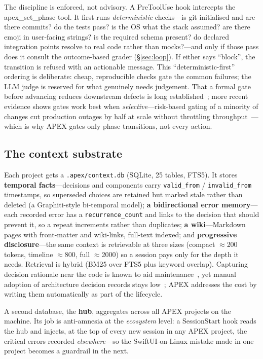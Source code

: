 \documentclass[sigconf,review,anonymous=false]{acmart}
\begin{document}
The discipline is enforced, not advisory. A \textsf{PreToolUse} hook intercepts the
\textsf{apex\_set\_phase} tool. It first runs \emph{deterministic} checks---is git
initialised and are there commits? do the tests pass? is the OS what the stack
assumed? are there emoji in user-facing strings? is the required schema present?
do declared integration points resolve to real code rather than mocks?---and only
if those pass does it consult the outcome-based grader (\S\ref{sec:loop}). If
either says ``block'', the transition is refused with an actionable message. This
``deterministic-first'' ordering is deliberate: cheap, reproducible checks gate the
common failures; the LLM judge is reserved for what genuinely needs judgement. That a
formal gate before advancing reduces downstream defects is long
established~\cite{fagan1986inspections,harter2000process}; more recent evidence shows
gates work best when \emph{selective}---risk-based gating of a minority of changes cut
production outages by half at scale without throttling
throughput~\cite{mockus2025riskgating}---which is why APEX gates only phase
transitions, not every action.

\subsection{The context substrate}
Each project gets a \texttt{.apex/context.db} (SQLite, 25 tables, FTS5). It stores
\textbf{temporal facts}---decisions and components carry \texttt{valid\_from} /
\texttt{invalid\_from} timestamps, so superseded choices are retained but marked
stale rather than deleted (a Graphiti-style bi-temporal model); \textbf{a
bidirectional error memory}---each recorded error has a \texttt{recurrence\_count}
and links to the decision that should prevent it, so a repeat increments rather than
duplicates; \textbf{a wiki}---Markdown pages with front-matter and wiki-links,
full-text indexed; and \textbf{progressive disclosure}---the same context is
retrievable at three sizes (compact \(\approx\)200 tokens, timeline
\(\approx\)800, full \(\approx\)2000) so a session pays only for the depth it
needs. Retrieval is hybrid (BM25 over FTS5 plus keyword overlap). Capturing decision
rationale near the code is known to aid maintenance~\cite{desouza2005documentation},
yet manual adoption of architecture decision records stays
low~\cite{buchgeher2023adrs}; APEX addresses the cost by writing them automatically as
part of the lifecycle.

A second database, the \textbf{hub}, aggregates across all APEX projects on the
machine. Its job is anti-amnesia at the \emph{ecosystem} level: a
\textsf{SessionStart} hook reads the hub and injects, at the top of every new
session in any APEX project, the critical errors recorded \emph{elsewhere}---so the
SwiftUI-on-Linux mistake made in one project becomes a guardrail in the next.
\end{document}

